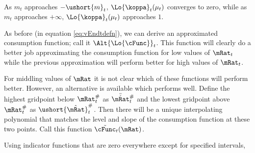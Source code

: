 As $m_{t}$ approaches
$-\ushort{m}_{t}$, $\Lo{\koppa}_{t}(\mu_{t})$ converges to zero, while as $m_{t}$
approaches $+\infty$, $\Lo{\koppa}_{t}(\mu_{t})$ approaches $1$.

As before (in equation \eqref{eq:vEndtdefn}), we can derive an approximated consumption function; call it
$\Alt{\Lo{\cFunc}}_{t}$.  This function will clearly do a better job approximating the consumption
function for low values of $\mRat_{t}$ while the previous approximation will perform better
for high values of $\mRat_{t}$.

For middling values of $\mRat$ it is not clear which of these
functions will perform better.  However, an alternative is available
which performs well.  Define the highest gridpoint below $\mtCusp$ as
$\bar{\check{\mRat}}_{t}^{\#}$ and the lowest gridpoint above $\mtCusp$ as
$\ushort{\hat{\mRat}}_{t}^{\#}$.  Then there will be a unique interpolating
polynomial that matches the level and slope of the consumption function
at these two points.  Call this function $\tilde{\cFunc}_{t}(\mRat)$.

Using indicator functions that are zero everywhere except for specified intervals,
